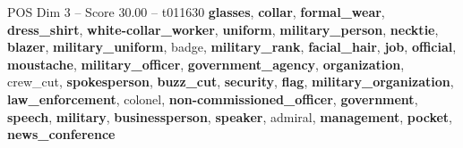 \begin{textsample}{POS Dim 3 – Score 30.00 – t011630}  \label{ex:f3_pos_035}
\textbf{glasses}, \textbf{collar}, \textbf{formal\_wear}, \textbf{dress\_shirt}, \textbf{white-collar\_worker}, \textbf{uniform}, \textbf{military\_person}, \textbf{necktie}, \textbf{blazer}, \textbf{military\_uniform}, badge, \textbf{military\_rank}, \textbf{facial\_hair}, \textbf{job}, \textbf{official}, \textbf{moustache}, \textbf{military\_officer}, \textbf{government\_agency}, \textbf{organization}, crew\_cut, \textbf{spokesperson}, \textbf{buzz\_cut}, \textbf{security}, \textbf{flag}, \textbf{military\_organization}, \textbf{law\_enforcement}, colonel, \textbf{non-commissioned\_officer}, \textbf{government}, \textbf{speech}, \textbf{military}, \textbf{businessperson}, \textbf{speaker}, admiral, \textbf{management}, \textbf{pocket}, \textbf{news\_conference}

\end{textsample}

